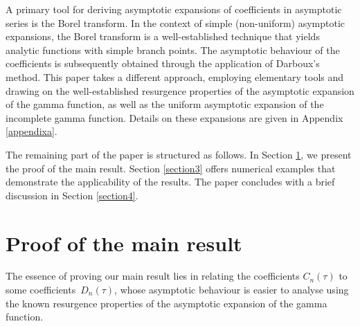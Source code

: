 \documentclass[pdftex]{sigma}
\numberwithin{equation}{section}
\begin{document}
A primary tool for deriving asymptotic expansions of coefficients in asymptotic series is the Borel transform. In the context of simple (non-uniform) asymptotic expansions, the Borel transform is a well-established technique that yields analytic functions with simple branch points. The asymptotic behaviour of the coefficients is subsequently obtained through the application of Darboux's method. This paper takes a different approach, employing elementary tools and drawing on the well-established resurgence properties of the asymptotic expansion of the gamma function, as well as the uniform asymptotic expansion of the incomplete gamma function. Details on these expansions are given in Appendix \ref{appendixa}.

The remaining part of the paper is structured as follows. In Section \ref{section2}, we present the proof of the main result. Section \ref{section3} offers numerical examples that demonstrate the applicability of the results. The paper concludes with a brief discussion in Section \ref{section4}.

\section{Proof of the main result}\label{section2}

The essence of proving our main result lies in relating the coefficients $C_n(\tau)$ to some coefficients~$D_n(\tau)$, whose asymptotic behaviour is easier to analyse using the known resurgence properties of the asymptotic expansion of the gamma function.
\end{document}

